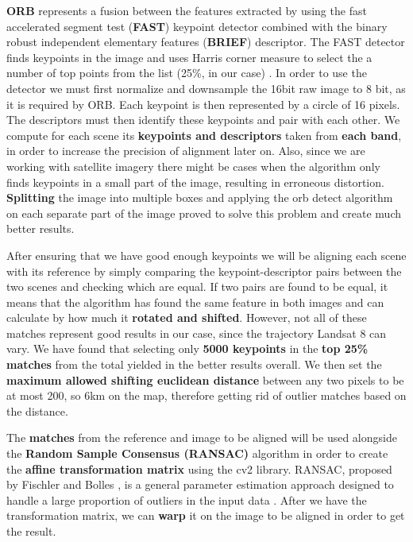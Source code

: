 \documentclass[12pt, a4paper]{report}
\begin{document}
	\par \textbf{ORB} represents a fusion between the features extracted by using the fast accelerated segment test (\textbf{FAST}) keypoint detector combined with the binary robust independent elementary features (\textbf{BRIEF}) descriptor. The FAST detector finds keypoints in the image and uses Harris corner measure to select the a number of top points from the list (25\%, in our case) \cite{orb}. In order to use the detector we must first normalize and downsample the 16bit raw image to 8 bit, as it is required by ORB. Each keypoint is then represented by a circle of 16 pixels. The descriptors must then identify these keypoints and pair with each other.
	We compute for each scene its \textbf{keypoints and descriptors} taken from \textbf{each band}, in order to increase the precision of alignment later on. Also, since we are working with satellite imagery there might be cases when the algorithm only finds keypoints in a small part of the image, resulting in erroneous distortion. \textbf{Splitting} the image into multiple boxes and applying the orb detect algorithm on each separate part of the image proved to solve this problem and create much better results. 
	
	\par After ensuring that we have good enough keypoints we will be aligning each scene with its reference by simply comparing the keypoint-descriptor pairs between the two scenes and checking which are equal. If two pairs are found to be equal, it means that the algorithm has found the same feature in both images and can calculate by how much it \textbf{rotated and shifted}. However, not all of these matches represent good results in our case, since the trajectory Landsat 8 can vary. We have found that selecting only \textbf{5000 keypoints} in the \textbf{top 25\% matches} from the total yielded in the better results overall. We then set the \textbf{maximum allowed shifting euclidean distance} between any two pixels to be at most 200, so 6km on the map, therefore getting rid of outlier matches based on the distance.
	
	\par The \textbf{matches} from the reference and image to be aligned will be used alongside the \textbf{Random Sample Consensus (RANSAC)} algorithm in order to create the \textbf{affine transformation matrix} using the cv2 library. RANSAC, proposed by Fischler and Bolles \cite{ransac}, is a general parameter estimation approach designed to handle a large proportion of outliers in the input data \cite{ransac2}. After we have the transformation matrix, we can \textbf{warp} it on the image to be aligned in order to get the result. 
	
\end{document}
